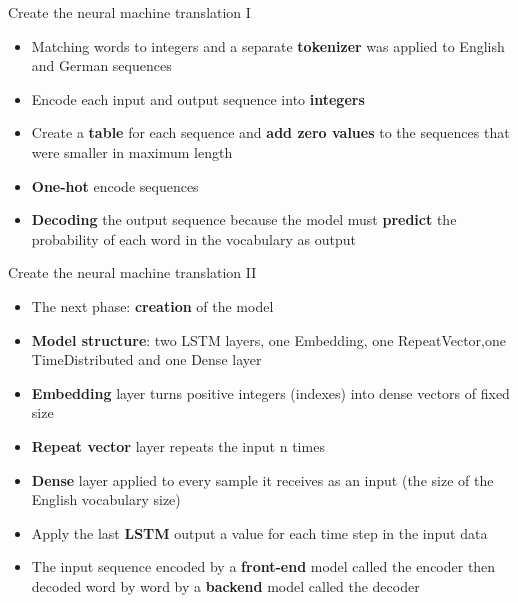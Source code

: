 \documentclass{beamer}
\begin{document}

\begin{frame}{Create the neural machine translation I}
	\begin{itemize}
		\item Matching words to integers and a separate \textbf{tokenizer} was applied to English and German sequences
		\item Encode each input and output sequence into \textbf{integers}
		\item Create a \textbf{table} for each sequence and \textbf{add zero values} to the sequences that were smaller in maximum length
		\item \textbf{One-hot} encode sequences
		\item \textbf{Decoding} the output sequence because the model must \textbf{predict} the probability of each word in the vocabulary as output
		
		
	\end{itemize}
\end{frame}



\begin{frame}{Create the neural machine translation II}
	\begin{itemize}
		\item The next phase: \textbf{creation} of the model
		\item \textbf{Model structure}: two LSTM layers, one Embedding, one RepeatVector,one TimeDistributed and one Dense layer
		\item \textbf{Embedding} layer turns positive integers (indexes) into dense vectors of fixed size
		\item \textbf{Repeat vector} layer repeats the input n times
		\item \textbf{Dense} layer applied to every sample it receives as an input (the size of the English vocabulary size)
		\item Apply the last \textbf{LSTM} output a value for each time step in the input data
		\item The input sequence encoded by a \textbf{front-end} model called the encoder then decoded word by word by a \textbf{backend} model called the decoder
	\end{itemize}
\end{frame}

\end{document}
